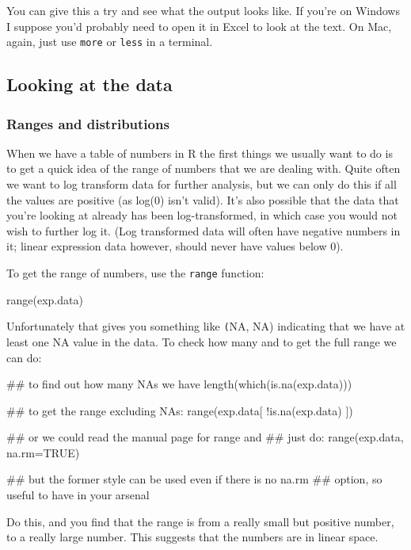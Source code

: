 \documentclass[11pt]{article}
\begin{document}
You can give this a try and see what the output looks like. If you're on
Windows I suppose you'd probably need to open it in Excel to look at
the text. On Mac, again, just use \texttt{more} or \texttt{less} in
a terminal.

\subsection{Looking at the data}
\label{sec-1-3}

\subsubsection{Ranges and distributions}
\label{sec-1-3-1}

When we have a table of numbers in R the first things we usually want
to do is to get a quick idea of the range of numbers that we are dealing
with. Quite often we want to log transform data for further analysis,
but we can only do this if all the values are positive (as log(0) isn't
valid). It's also possible that the data that you're looking at already
has been log-transformed, in which case you would not wish to further
log it. (Log transformed data will often have negative numbers in it;
linear expression data however, should never have values below 0).

To get the range of numbers, use the \texttt{range} function:

\begin{rcode}
range(exp.data)
\end{rcode}

Unfortunately that gives you something like \texttt(NA, NA) indicating that
we have at least one NA value in the data. To check how many and
to get the full range we can do:

\begin{rcode}
## to find out how many NAs we have
length(which(is.na(exp.data)))

## to get the range excluding NAs:
range(exp.data[ !is.na(exp.data) ])

## or we could read the manual page for range and
## just do:
range(exp.data, na.rm=TRUE)

## but the former style can be used even if there is no na.rm
## option, so useful to have in your arsenal
\end{rcode}

Do this, and you find that the range is from a really small
but positive number, to a really large number. This suggests
that the numbers are in linear space.
\end{document}
